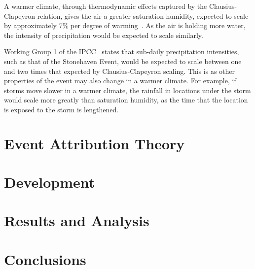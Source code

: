 \documentclass[12pt,a4paper,openany]{report}
\begin{document}
A warmer climate,
    through thermodynamic effects captured by the Clausius-Clapeyron relation,
    gives the air a greater saturation humidity,
    expected to scale by approximately 7\% per degree of warming~\cite{Fowler_2021}.
As the air is holding more water,
    the intensity of precipitation would be expected to scale similarly.

Working Group 1 of the IPCC~\cite{IPCC_2021} states that sub-daily precipitation intensities,
    such as that of the Stonehaven Event,
    would be expected to scale between one and two times that expected by Clausius-Clapeyron scaling.
This is as other properties of the event may also change in a warmer climate.
For example,
    if storms move slower in a warmer climate,
    the rainfall in locations under the storm would scale more greatly than saturation humidity,
    as the time that the location is exposed to the storm is lengthened.

\chapter{Event Attribution Theory}\label{ch:attribution}


\chapter{Development}\label{ch:dev}


\chapter{Results and Analysis}\label{ch:results}


\chapter{Conclusions}\label{ch:conclusions}
\end{document}
